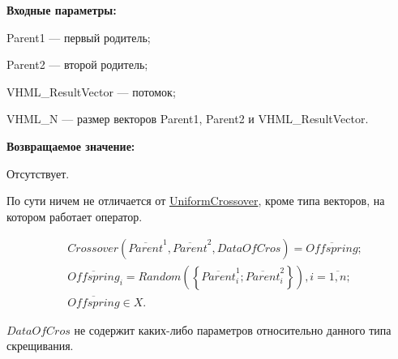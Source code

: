 \textbf{Входные параметры:}
 
 Parent1 --- первый родитель;
 
 Parent2 --- второй родитель;
 
 VHML\_ResultVector --- потомок;
 
 VHML\_N --- размер векторов Parent1, Parent2 и VHML\_ResultVector.

\textbf{Возвращаемое значение:}

 Отсутствует.
 
По сути ничем не отличается от \hyperref[SetOfOperatorsAlgorithms:UniformCrossover]{UniformCrossover}, кроме типа векторов, на котором работает оператор.
 
\begin{align*}
&Crossover \left( \overline{Parent}^1, \overline{Parent}^2, DataOfCros\right) = \overline{Offspring};\\
& \overline{Offspring}_i=Random\left( \left\lbrace \overline{Parent}^1_i;\overline{Parent}^2_i\right\rbrace \right), i=\overline{1,n} ;\nonumber\\
&\overline{Offspring}\in X.\nonumber
\end{align*}

$ DataOfCros $ не содержит каких-либо параметров относительно данного типа скрещивания.